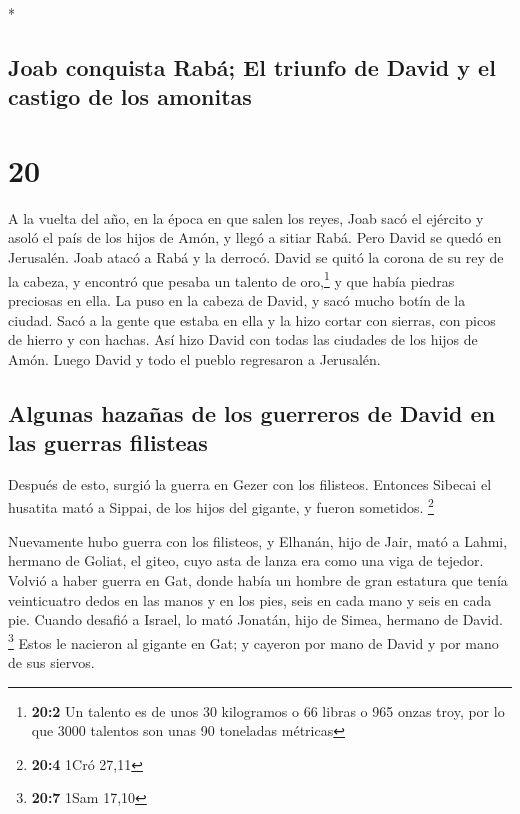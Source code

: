 \begin{paracol}{2}
\begin{otherlanguage}{english}
\end{otherlanguage}

\switchcolumn[0]*

\hypertarget{joab-conquista-rabuxe1-el-triunfo-de-david-y-el-castigo-de-los-amonitas}{%
\subsection{Joab conquista Rabá; El triunfo de David y el castigo de los
amonitas}\label{joab-conquista-rabuxe1-el-triunfo-de-david-y-el-castigo-de-los-amonitas}}

\hypertarget{section-38}{%
\section{20}\label{section-38}}

 A la vuelta del año, en la época en que salen los reyes,
Joab sacó el ejército y asoló el país de los hijos de Amón, y llegó a
sitiar Rabá. Pero David se quedó en Jerusalén. Joab atacó a Rabá y la
derrocó.  David se quitó la corona de su rey de la cabeza,
y encontró que pesaba un talento de oro,\footnote{\textbf{20:2} Un
  talento es de unos 30 kilogramos o 66 libras o 965 onzas troy, por lo
  que 3000 talentos son unas 90 toneladas métricas} y que había piedras
preciosas en ella. La puso en la cabeza de David, y sacó mucho botín de
la ciudad.  Sacó a la gente que estaba en ella y la hizo
cortar con sierras, con picos de hierro y con hachas. Así hizo David con
todas las ciudades de los hijos de Amón. Luego David y todo el pueblo
regresaron a Jerusalén.

\hypertarget{algunas-hazauxf1as-de-los-guerreros-de-david-en-las-guerras-filisteas}{%
\subsection{Algunas hazañas de los guerreros de David en las guerras
filisteas}\label{algunas-hazauxf1as-de-los-guerreros-de-david-en-las-guerras-filisteas}}

 Después de esto, surgió la guerra en Gezer con los
filisteos. Entonces Sibecai el husatita mató a Sippai, de los hijos del
gigante, y fueron sometidos. \footnote{\textbf{20:4} 1Cró 27,11}

 Nuevamente hubo guerra con los filisteos, y Elhanán, hijo
de Jair, mató a Lahmi, hermano de Goliat, el giteo, cuyo asta de lanza
era como una viga de tejedor.  Volvió a haber guerra en
Gat, donde había un hombre de gran estatura que tenía veinticuatro dedos
en las manos y en los pies, seis en cada mano y seis en cada pie.
 Cuando desafió a Israel, lo mató Jonatán, hijo de Simea,
hermano de David. \footnote{\textbf{20:7} 1Sam 17,10} 
Estos le nacieron al gigante en Gat; y cayeron por mano de David y por
mano de sus siervos.


\end{paracol}
